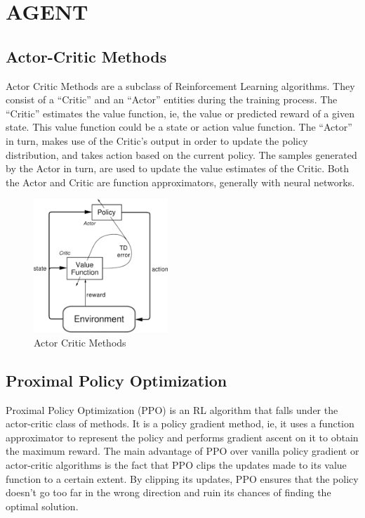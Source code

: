 \section{AGENT} \label{ch4Agent}

\subsection{Actor-Critic Methods}
Actor Critic Methods are a subclass of Reinforcement Learning algorithms. They consist of a “Critic” and an “Actor” entities during the training process. The “Critic” estimates the value function, ie, the value or predicted reward of a given state. This value function could be a state or action value function. The “Actor” in turn, makes use of the Critic’s output in order to update the policy distribution, and takes action based on the current policy. The samples generated by the Actor in turn, are used to update the value estimates of the Critic. Both the Actor and Critic are function approximators, generally with neural networks. 

\begin{figure}[H]
    \centering
    \includegraphics[width=0.45\textwidth]{images/ActorCriticMethod.png}
    \caption{Actor Critic Methods}
    \label{fig:rl}
\end{figure}

\subsection{Proximal Policy Optimization}
Proximal Policy Optimization (PPO) is an RL algorithm that falls under the actor-critic class of methods. It is a policy gradient method, ie, it uses a function approximator to represent the policy and performs gradient ascent on it to obtain the maximum reward. The main advantage of PPO over vanilla policy gradient or actor-critic algorithms is the fact that PPO clips the updates made to its value function to a certain extent. By clipping its updates, PPO ensures that the policy doesn’t go too far in the wrong direction and ruin its chances of finding the optimal solution.

